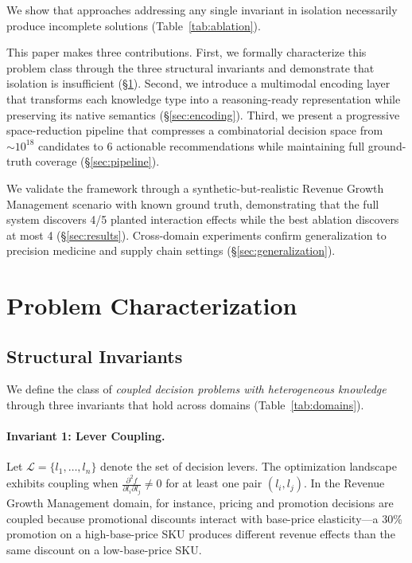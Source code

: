 \documentclass[11pt,a4paper]{article}
\begin{document}
We show that approaches addressing any single invariant in isolation necessarily produce incomplete solutions (Table~\ref{tab:ablation}).

This paper makes three contributions.
First, we formally characterize this problem class through the three structural invariants and demonstrate that isolation is insufficient (\S\ref{sec:problem}).
Second, we introduce a multimodal encoding layer that transforms each knowledge type into a reasoning-ready representation while preserving its native semantics (\S\ref{sec:encoding}).
Third, we present a progressive space-reduction pipeline that compresses a combinatorial decision space from $\sim 10^{18}$ candidates to 6 actionable recommendations while maintaining full ground-truth coverage (\S\ref{sec:pipeline}).

We validate the framework through a synthetic-but-realistic Revenue Growth Management scenario with known ground truth, demonstrating that the full system discovers 4/5 planted interaction effects while the best ablation discovers at most 4 (\S\ref{sec:results}).
Cross-domain experiments confirm generalization to precision medicine and supply chain settings (\S\ref{sec:generalization}).


\section{Problem Characterization}
\label{sec:problem}

\subsection{Structural Invariants}

We define the class of \emph{coupled decision problems with heterogeneous knowledge} through three invariants that hold across domains (Table~\ref{tab:domains}).

\paragraph{Invariant 1: Lever Coupling.}
Let $\mathcal{L} = \{l_1, \ldots, l_n\}$ denote the set of decision levers.
The optimization landscape exhibits coupling when $\frac{\partial^2 f}{\partial l_i \partial l_j} \neq 0$ for at least one pair $(l_i, l_j)$.
In the Revenue Growth Management domain, for instance, pricing and promotion decisions are coupled because promotional discounts interact with base-price elasticity---a 30\% promotion on a high-base-price SKU produces different revenue effects than the same discount on a low-base-price SKU.
\end{document}
